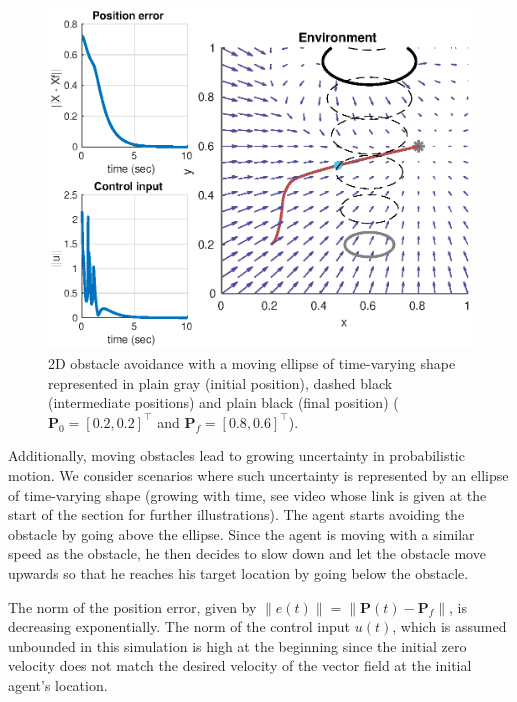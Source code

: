 \begin{figure}[H]
  \centering
  \includegraphics[width=1\linewidth]{img/movingellipsetimevaryingshape.eps}
  \caption{2D obstacle avoidance with a moving ellipse of time-varying shape represented in plain gray (initial position), dashed black (intermediate positions) and plain black (final position) ($\bm{P}_0 = [0.2,0.2]^\top$ and $\bm{P}_f = [0.8,0.6]^\top$).}
  \label{fig:movingellipse}
\end{figure}

Additionally, moving obstacles lead to growing uncertainty in probabilistic motion. We consider scenarios where such uncertainty is represented by an ellipse of time-varying shape (growing with time, see video whose link is given at the start of the section for further illustrations). The agent starts avoiding the obstacle by going above the ellipse. Since the agent is moving with a similar speed as the obstacle, he then decides to slow down and let the obstacle move upwards so that he reaches his target location by going below the obstacle. 

The norm of the position error, given by $\|e(t)\| = \|\bm{P}(t) - \bm{P}_f\|$, is decreasing exponentially.
The norm of the control input $u(t)$, which is assumed unbounded in this simulation is high at the beginning since the initial zero velocity does not match the desired velocity of the vector field at the initial agent's location. 

